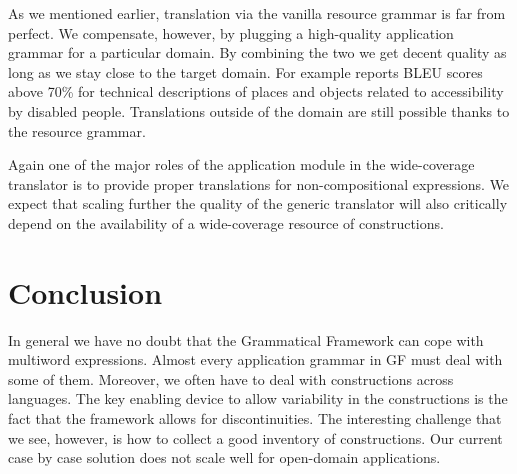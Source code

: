 \documentclass[output=paper]{LSP/langsci}
\begin{document}
As we mentioned earlier, translation via the vanilla resource grammar
is far from perfect. We compensate, however, by plugging a high-quality
application grammar for a particular domain. By combining the two
we get decent quality as long as we stay close to the target domain.
For example \cite{ranta2015grammar} reports BLEU scores above 70\%
for technical descriptions of places and objects related to accessibility
by disabled people.
Translations outside of the domain are still possible thanks to the
resource grammar. 

Again one of the major roles of the application module in 
the wide-coverage translator is to provide proper translations
for non-compositional expressions. We expect that scaling 
further the quality of the generic translator will also critically
depend on the availability of a wide-coverage resource of constructions.

\section{Conclusion}

In general we have no doubt that the Grammatical Framework can cope
with multiword expressions. Almost every application grammar in GF
must deal with some of them. Moreover, we often have to deal with
constructions across languages. The key enabling device to allow
variability in the constructions is the fact that the framework
allows for discontinuities. The interesting challenge that we see,
however, is how to collect a good inventory of constructions.
Our current case by case solution does not scale well for open-domain
applications.


\printbibliography[heading=subbibliography,notkeyword=this]
\end{document}

